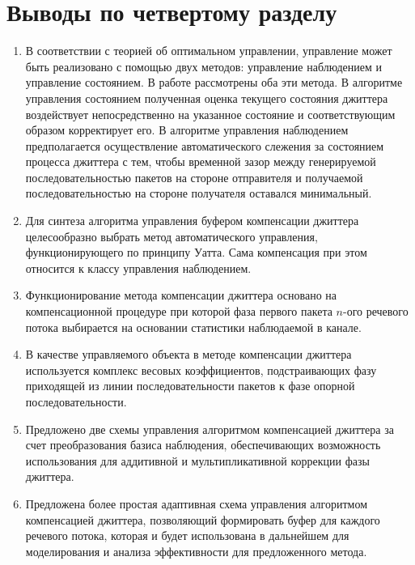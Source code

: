 \section{Выводы по четвертому разделу}
\begin{enumerate}

 \item
 В соответствии с теорией об оптимальном управлении, управление может быть реализовано с помощью двух методов:
 управление наблюдением и управление состоянием.
 В работе рассмотрены оба эти метода.
 В алгоритме управления состоянием полученная оценка текущего состояния джиттера воздействует непосредственно на указанное состояние и соответствующим образом корректирует его.
 В алгоритме управления наблюдением предполагается осуществление автоматического 
 слежения за состоянием процесса джиттера с тем, чтобы временной зазор между генерируемой 
 последовательностью пакетов на стороне отправителя и получаемой последовательностью на стороне получателя оставался минимальный.
 
  \item Для синтеза алгоритма управления буфером компенсации джиттера целесообразно выбрать метод автоматического управления, функционирующего по принципу Уатта. 
 Сама компенсация при этом относится к классу управления наблюдением.
 \item Функционирование метода компенсации джиттера основано на компенсационной процедуре при которой фаза первого пакета $n$-ого речевого потока выбирается на основании статистики наблюдаемой в канале.
 \item В качестве управляемого объекта в методе компенсации джиттера используется комплекс весовых коэффициентов, подстраивающих фазу приходящей из линии последовательности пакетов к фазе опорной последовательности.
 \item Предложено две схемы управления алгоритмом компенсацией джиттера за счет преобразования базиса наблюдения, обеспечивающих возможность использования для аддитивной и мультипликативной коррекции фазы джиттера.
 \item Предложена более простая адаптивная схема управления алгоритмом компенсацией джиттера, позволяющий формировать буфер для каждого речевого потока, которая и будет использована в дальнейшем для моделирования и анализа эффективности для предложенного метода.
\end{enumerate}
